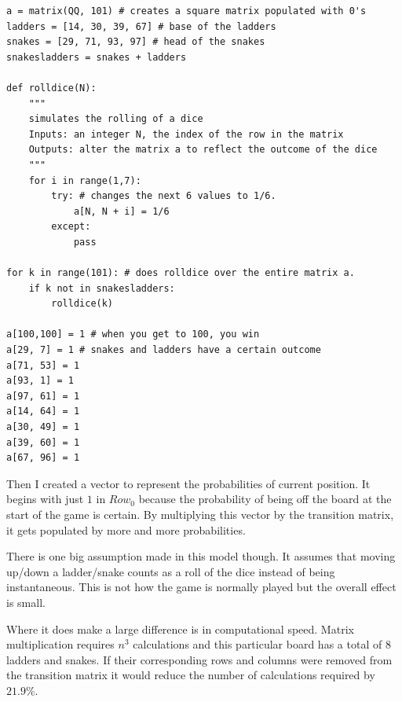 \documentclass[a4paper]{article}
\begin{document}
\begin{verbatim}
a = matrix(QQ, 101) # creates a square matrix populated with 0's
ladders = [14, 30, 39, 67] # base of the ladders
snakes = [29, 71, 93, 97] # head of the snakes
snakesladders = snakes + ladders

def rolldice(N):
    """
    simulates the rolling of a dice
    Inputs: an integer N, the index of the row in the matrix
    Outputs: alter the matrix a to reflect the outcome of the dice
    """
    for i in range(1,7):
        try: # changes the next 6 values to 1/6.
            a[N, N + i] = 1/6
        except:
            pass

for k in range(101): # does rolldice over the entire matrix a.
    if k not in snakesladders:
        rolldice(k)

a[100,100] = 1 # when you get to 100, you win
a[29, 7] = 1 # snakes and ladders have a certain outcome
a[71, 53] = 1
a[93, 1] = 1
a[97, 61] = 1
a[14, 64] = 1
a[30, 49] = 1
a[39, 60] = 1
a[67, 96] = 1
\end{verbatim}

Then I created a vector to represent the probabilities of current position. It begins with just $1$ in $Row_0$ because the probability of being off the board at the start of the game is certain. By multiplying this vector by the transition matrix, it gets populated by more and more probabilities.

There is one big assumption made in this model though. It assumes that moving up/down a ladder/snake counts as a roll of the dice instead of being instantaneous. This is not how the game is normally played but the overall effect is small.

Where it does make a large difference is in computational speed. Matrix multiplication requires $n^3$ calculations and this particular board has a total of 8 ladders and snakes. If their corresponding rows and columns were removed from the transition matrix it would reduce the number of calculations required by $21.9\%$.



\end{document}
